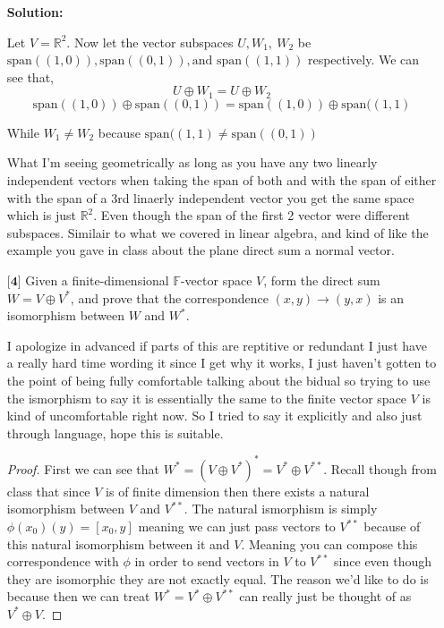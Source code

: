 \documentclass[12pt]{article}
\newcommand      {\Rm}         {{\mathbb R}}
\begin{document}
\begin{itemize}
    \textbf{Solution:}
    
        Let $V = \Rm^2$. Now let the vector subspaces $U,W_1,\ W_2$ be $\text{span}((1,0)), \text{span}((0,1)), \text{and }\text{span}((1,1))$ respectively. We can see that, 
        \[U \oplus W_1 = U \oplus W_2\]
        \[\text{span}((1,0))\oplus \text{span}((0,1)) = \text{span}((1,0))\oplus\text{span}((1,1)\]

        While $W_1 \neq W_2$ because $\text{span}((1,1) \neq \text{span}((0,1))$

    
        What I'm seeing geometrically as long as you have any two linearly independent vectors when taking the span of both and with the span of either with the span of a 3rd linaerly independent vector you get the same space which is just $\Rm^2$. Even though the span of the first 2 vector were different subspaces. Similair to what we covered in linear algebra, and kind of like the example you gave in class about the plane direct sum a normal vector. 
    \vspace{.5cm}
    \item[$\textbf{[4]}$]
    Given a finite-dimensional $\mathbb{F}$-vector space $V$, form the direct sum $W = V \oplus V^*$, and prove that the correspondence $(x,y) \rightarrow (y,x)$ is an isomorphism between $W$ and $W^*$. 

    I apologize in advanced if parts of this are reptitive or redundant I just have a really hard time wording it since I get why it works, I just haven't gotten to the point of being fully comfortable talking about the bidual so trying to use the ismorphism to say it is essentially the same to the finite vector space $V$ is kind of uncomfortable right now. So I tried to say it explicitly and also just through language, hope this is suitable. 

    \begin{proof}
        First we can see that $W^* = (V\oplus V^*)^* = V^* \oplus V^{**}$. Recall though from class that since $V$ is of finite dimension then there exists a natural isomorphism between $V$ and $V^{**}$. The natural ismorphism is simply $\phi(x_0)(y) = [x_0,y]$ meaning we can just pass vectors to $V^{**}$ because of this natural isomorphism between it and $V$. Meaning you can compose this correspondence with $\phi$ in order to send vectors in $V$ to $V^{**}$ since even though they are isomorphic they are not exactly equal. The reason we'd like to do is because then we can treat $W^{*} = V^*\oplus V^{**}$ can really just be thought of as $V^* \oplus V$.
        

\end{proof}
\end{itemize}
\end{document}
